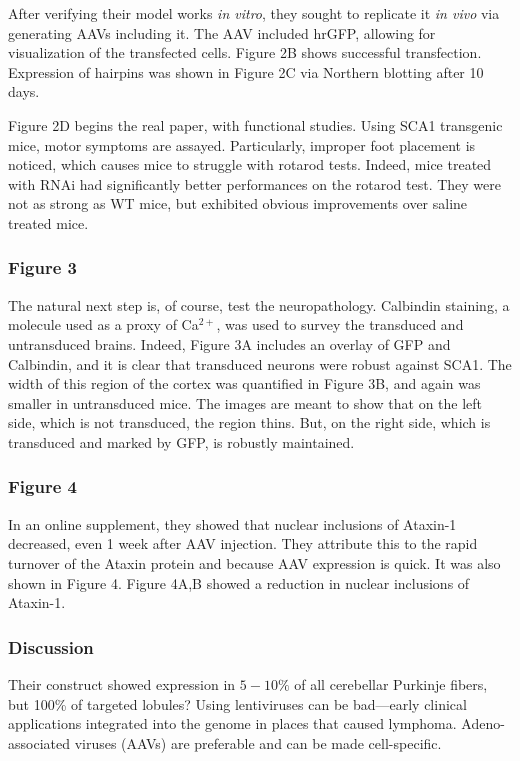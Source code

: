 After verifying their model works \textit{in vitro}, they sought to replicate it \textit{in vivo} via generating AAVs including it. The AAV included hrGFP, allowing for visualization of the transfected cells. Figure 2B shows successful transfection. Expression of hairpins was shown in Figure 2C via Northern blotting after 10 days.\newline

Figure 2D begins the real paper, with functional studies. Using SCA1 transgenic mice, motor symptoms are assayed. Particularly, improper foot placement is noticed, which causes mice to struggle with rotarod tests. Indeed, mice treated with RNAi had significantly better performances on the rotarod test. They were not as strong as WT mice, but exhibited obvious improvements over saline treated mice. 

\subsubsection*{Figure 3}

The natural next step is, of course, test the neuropathology. Calbindin staining, a molecule used as a proxy of Ca$^{2+}$, was used to survey the transduced and untransduced brains. Indeed, Figure 3A includes an overlay of GFP and Calbindin, and it is clear that transduced neurons were robust against SCA1. The width of this region of the cortex was quantified in Figure 3B, and again was smaller in untransduced mice. The images are meant to show that on the left side, which is not transduced, the region thins. But, on the right side, which is transduced and marked by GFP, is robustly maintained. 

\subsubsection*{Figure 4}

In an online supplement, they showed that nuclear inclusions of Ataxin-1 decreased, even 1 week after AAV injection. They attribute this to the rapid turnover of the Ataxin protein and because AAV expression is quick. It was also shown in Figure 4. Figure 4A,B showed a reduction in nuclear inclusions of Ataxin-1. 

\subsubsection*{Discussion}

Their construct showed expression in $5-10\%$ of all cerebellar Purkinje fibers, but 100\% of targeted lobules? Using lentiviruses can be bad---early clinical applications integrated into the genome in places that caused lymphoma. Adeno-associated viruses (AAVs) are preferable and can be made cell-specific. 



